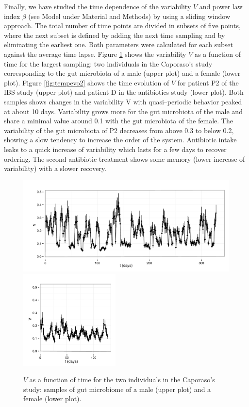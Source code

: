 Finally, we have studied the time dependence of the variability $V$ and power law index $\beta$ (see Model under Material and Methods) by using a sliding window approach. The total number of time points are divided in subsets of five points, where the next subset is defined by adding the next time sampling and by eliminating the earliest one. Both parameters were calculated for each subset against the average time lapse. Figure \ref{fig:tempevo1} shows the variability  $V$ as a function of time for the largest sampling: two individuals in the Caporaso's study\cite{moving} corresponding to the gut microbiota of a male (upper plot) and a female (lower plot). Figure \ref{fig:tempevo2} shows the time evolution of $V$ for patient P2 of the IBS study\cite{IBS} (upper plot) and patient D in the antibiotics study\cite{antibiotic} (lower plot). Both samples shows changes in the variability V with quasi--periodic behavior peaked at about 10 days. Variability grows more for the gut microbiota of the male and share a minimal value around 0.1 with the gut microbiota of the female. The variability of the gut microbiota of P2 decreases from above 0.3 to below 0.2, showing a slow tendency to increase the order of the system.  Antibiotic intake leaks to a quick increase of variability which lasts for a few days to recover ordering. The second antibiotic treatment shows some memory (lower increase of variability) with a slower recovery.

\begin{figure}
	\includegraphics[width=1.0\textwidth]{results/sliwin/male_mov.pdf}
	\hspace*{3mm}\includegraphics[width=0.448\textwidth]{results/sliwin/female_mov.pdf}
\caption{$V$ as a function of time for the two individuals in the Caporaso's study\cite{moving}: samples of gut microbiome of a male (upper plot) and a female (lower plot).}
\label{fig:tempevo1}
\end{figure}

